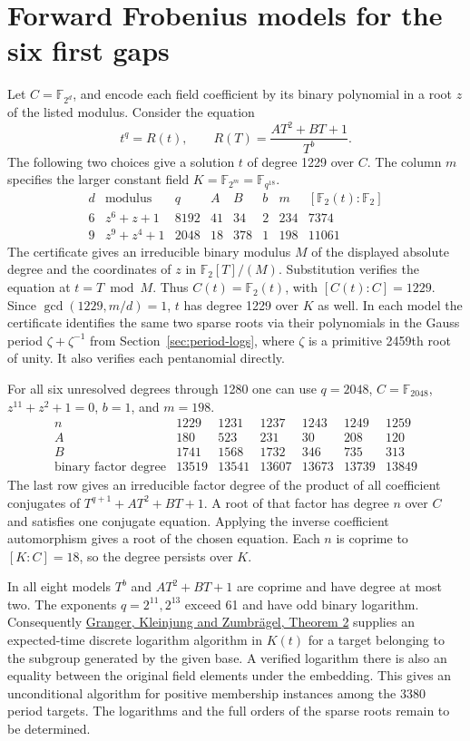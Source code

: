 \documentclass[11pt]{article}
\newcommand{\F}{\mathbb F_2}
\begin{document}
\section{Forward Frobenius models for the six first gaps}\label{sec:forward-descent}
Let \(C=\mathbb F_{2^d}\), and encode each field coefficient by its binary
polynomial in a root \(z\) of the listed modulus. Consider the equation
\[
 t^q=R(t),\qquad R(T)=\frac{AT^2+BT+1}{T^b}.
\]
The following two choices give a solution \(t\) of degree 1229 over \(C\).
The column \(m\) specifies the larger constant field
\(K=\mathbb F_{2^m}=\mathbb F_{q^{18}}\).
\[
\begin{array}{c|c|r|r|r|c|r|r}
d&\text{modulus}&q&A&B&b&m&[\mathbb F_2(t):\mathbb F_2]\\\hline
6&z^6+z+1&8192&41&34&2&234&7374\\
9&z^9+z^4+1&2048&18&378&1&198&11061
\end{array}
\]
The certificate gives an irreducible binary modulus \(M\) of the displayed
absolute degree and the coordinates of \(z\) in \(\F[T]/(M)\). Substitution
verifies the equation at \(t=T\bmod M\). Thus \(C(t)=\F(t)\), with
\([C(t):C]=1229\). Since \(\gcd(1229,m/d)=1\), \(t\) has degree 1229
over \(K\) as well. In each model the certificate identifies the same
two sparse roots via their polynomials in the Gauss period
\(\zeta+\zeta^{-1}\) from Section~\ref{sec:period-logs}, where \(\zeta\)
is a primitive 2459th root of unity. It also verifies each pentanomial directly.

For all six unresolved degrees through 1280 one can use \(q=2048\),
\(C=\mathbb F_{2048}\), \(z^{11}+z^2+1=0\), \(b=1\), and \(m=198\).
\[
\begin{array}{c|rrrrrr}
n&1229&1231&1237&1243&1249&1259\\\hline
A&180&523&231&30&208&120\\
B&1741&1568&1732&346&735&313\\
\text{binary factor degree}&13519&13541&13607&13673&13739&13849
\end{array}
\]
The last row gives an irreducible factor degree of the product of all
coefficient conjugates of \(T^{q+1}+AT^2+BT+1\). A root of that factor
has degree \(n\) over \(C\) and satisfies one conjugate equation.
Applying the inverse coefficient automorphism gives a root of the chosen
equation. Each \(n\) is coprime to \([K:C]=18\), so the degree persists
over \(K\).

In all eight models \(T^b\) and \(AT^2+BT+1\) are coprime and have degree
at most two. The exponents \(q=2^{11},2^{13}\) exceed 61 and have odd
binary logarithm. Consequently
\href{https://arxiv.org/abs/1507.01495}{Granger, Kleinjung and
Zumbr\"agel, Theorem 2} supplies an expected-time discrete logarithm
algorithm in \(K(t)\) for a target belonging to the subgroup generated by
the given base. A verified logarithm there is also an equality between
the original field elements under the embedding. This gives an
unconditional algorithm for positive membership instances among the
3380 period targets. The logarithms and the full orders of the sparse
roots remain to be determined.
\end{document}
